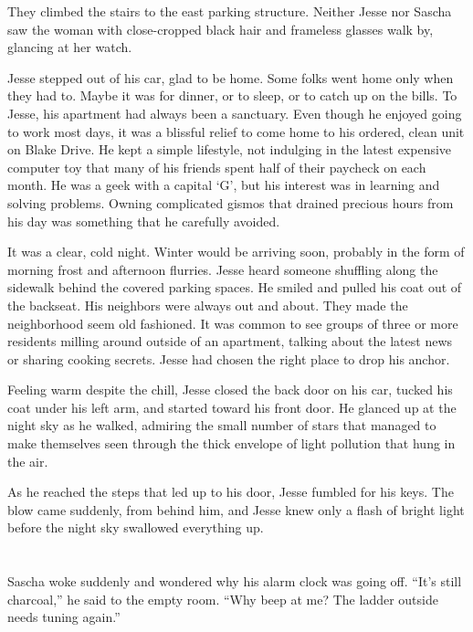 \documentclass[12pt]{book}
\begin{document}
They climbed the stairs to the east parking structure.  Neither Jesse nor Sascha saw the woman with close-cropped black hair and frameless glasses walk by, glancing at her watch.


Jesse stepped out of his car, glad to be home.  Some folks went home only when they had to.  Maybe it was for dinner, or to sleep, or to catch up on the bills.  To Jesse, his apartment had always been a sanctuary.  Even though he enjoyed going to work most days, it was a blissful relief to come home to his ordered, clean unit on Blake Drive.  He kept a simple lifestyle, not indulging in the latest expensive computer toy that many of his friends spent half of their paycheck on each month.  He was a geek with a capital `G', but his interest was in learning and solving problems.  Owning complicated gismos that drained precious hours from his day was something that he carefully avoided.

It was a clear, cold night.  Winter would be arriving soon, probably in the form of morning frost and afternoon flurries.  Jesse heard someone shuffling along the sidewalk behind the covered parking spaces.  He smiled and pulled his coat out of the backseat.  His neighbors were always out and about.  They made the neighborhood seem old fashioned.  It was common to see groups of three or more residents milling around outside of an apartment, talking about the latest news or sharing cooking secrets.  Jesse had chosen the right place to drop his anchor.

Feeling warm despite the chill, Jesse closed the back door on his car, tucked his coat under his left arm, and started toward his front door.  He glanced up at the night sky as he walked, admiring the small number of stars that managed to make themselves seen through the thick envelope of light pollution that hung in the air.

As he reached the steps that led up to his door, Jesse fumbled for his keys.  The blow came suddenly, from behind him, and Jesse knew only a flash of bright light before the night sky swallowed everything up.

\chapter{}
										
Sascha woke suddenly and wondered why his alarm clock was going off.  ``It's still charcoal,'' he said to the empty room.  ``Why beep at me?  The ladder outside needs tuning again.''
\end{document}
